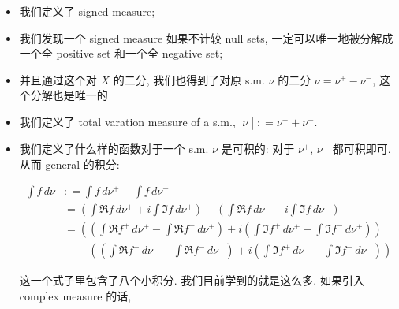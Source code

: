 \begin{itemize}
\item
  我们定义了 signed measure;
\item
  我们发现一个 signed measure 如果不计较 null sets, 一定可以唯一地被分解成一个全 positive set 和一个全 negative set;
\item
  并且通过这个对 \(X\) 的二分, 我们也得到了对原 s.m. \(\nu\) 的二分 \(\nu = \nu^{+} - \nu^{-}\), 这个分解也是唯一的
\item
  我们定义了 total varation measure of a s.m., \(\left. |\nu \middle| : = \nu^{+} + \nu^{-} \right.\).
\item
  我们定义了什么样的函数对于一个 s.m. \(\nu\) 是可积的: 对于 \(\nu^{+}\), \(\nu^{-}\) 都可积即可. 从而 general 的积分:

  \[\begin{matrix}
  {\int f\, d\nu} & {: = \int f\, d\nu^{+} - \int f\, d\nu^{-}} \\
   & {= (\int\Re f\, d\nu^{+} + i\int\Im f\, d\nu^{+}) - (\int\Re f\, d\nu^{-} + i\int\Im f\, d\nu^{-})} \\
   & {= ((\int\Re f^{+}\, d\nu^{+} - \int\Re f^{-}\, d\nu^{+}) + i(\int\Im f^{+}\, d\nu^{+} - \int\Im f^{-}\, d\nu^{+}))} \\
   & {\quad - ((\int\Re f^{+}\, d\nu^{-} - \int\Re f^{-}\, d\nu^{-}) + i(\int\Im f^{+}\, d\nu^{-} - \int\Im f^{-}\, d\nu^{-}))}
  \end{matrix}\]

  这一个式子里包含了八个小积分. 我们目前学到的就是这么多. 如果引入 complex measure 的话,
\end{itemize}
